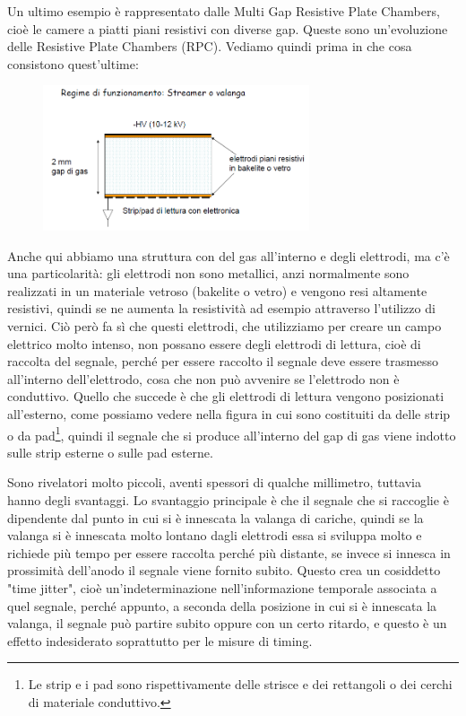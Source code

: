 Un ultimo esempio è rappresentato dalle Multi Gap Resistive Plate Chambers, cioè le camere a piatti piani resistivi con diverse gap. Queste sono un'evoluzione delle Resistive Plate Chambers (RPC). Vediamo quindi prima in che cosa consistono quest'ultime:
\begin{figure}[H]
   \centering
   \includegraphics[width=0.7\textwidth]{immagini/RPC.png}
\end{figure}
Anche qui abbiamo una struttura con del gas all'interno e degli elettrodi, ma c'è una particolarità: gli elettrodi non sono metallici, anzi normalmente sono realizzati in un materiale vetroso (bakelite o vetro) e vengono resi altamente resistivi, quindi se ne aumenta la resistività ad esempio attraverso l'utilizzo di vernici. Ciò però fa sì che questi elettrodi, che utilizziamo per creare un campo elettrico molto intenso, non possano essere degli elettrodi di lettura, cioè di raccolta del segnale, perché per essere raccolto il segnale deve essere trasmesso all'interno dell'elettrodo, cosa che non può avvenire se l'elettrodo non è conduttivo. Quello che succede è che gli elettrodi di lettura vengono posizionati all'esterno, come possiamo vedere nella figura in cui sono costituiti da delle strip o da pad\footnote{Le strip e i pad sono rispettivamente delle strisce e dei rettangoli o dei cerchi di materiale conduttivo.}, quindi il segnale che si produce all'interno del gap di gas viene indotto sulle strip esterne o sulle pad esterne.

Sono rivelatori molto piccoli, aventi spessori di qualche millimetro, tuttavia hanno degli svantaggi. Lo svantaggio principale è che il segnale che si raccoglie è dipendente dal punto in cui si è innescata la valanga di cariche, quindi se la valanga si è innescata molto lontano dagli elettrodi essa si sviluppa molto e richiede più tempo per essere raccolta perché più distante, se invece si innesca in prossimità dell'anodo il segnale viene fornito subito. Questo crea un cosiddetto "time jitter", cioè un'indeterminazione nell'informazione temporale associata a quel segnale, perché appunto, a seconda della posizione in cui si è innescata la valanga, il segnale può partire subito oppure con un certo ritardo, e questo è un effetto indesiderato soprattutto per le misure di timing.

